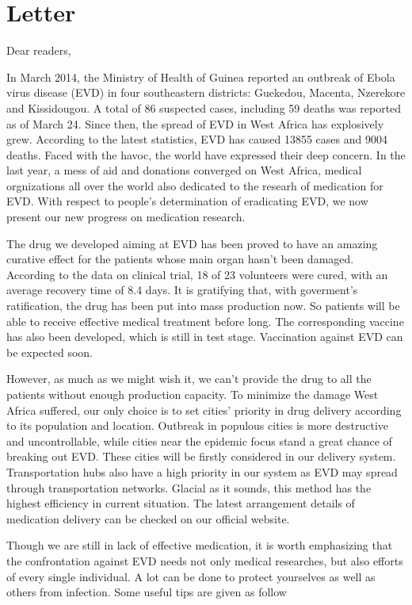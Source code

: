 \section{Letter}
Dear readers,

In March 2014, the Ministry of Health of Guinea reported an outbreak of Ebola virus disease (EVD) in four southeastern districts: Guekedou, Macenta, Nzerekore and Kissidougou. A total of 86 suspected cases, including 59 deaths was reported as of March 24. Since then, the spread of EVD in West Africa has explosively grew. According to the latest statistics, EVD has caused 13855 cases and 9004 deaths. Faced with the havoc, the world have expressed their deep concern. In the last year, a mess of aid and donations converged on West Africa, medical orgnizations all over the world also dedicated to the researh of medication for EVD. With respect to people's determination of eradicating EVD, we now present our new progress on medication research.


The drug we developed aiming at EVD has been proved to have an amazing curative effect for the patients whose main organ hasn't been damaged. According to the data on clinical trial, 18 of 23 volunteers were cured, with an average recovery time of 8.4 days. It is gratifying that, with goverment's ratification, the drug has been put into mass production now. So patients will be able to receive effective medical treatment before long. The corresponding vaccine has also been developed, which is still in test stage. Vaccination against EVD can be expected soon.


However, as much as we might wish it, we can't provide the drug to all the patients without enough production capacity. To minimize the damage West Africa suffered, our only choice is to set cities' priority in drug delivery according to its population and location. Outbreak in populous cities is more destructive and uncontrollable, while cities near the epidemic focus stand a great chance of breaking out EVD. These cities will be firstly considered in our delivery system. Transportation hubs also have a high priority in our system as EVD may spread through transportation networks. Glacial as it sounds, this method has the highest efficiency in current situation. The latest arrangement details of medication delivery can be checked on our official website.

Though we are still in lack of effective medication, it is worth emphasizing that the confrontation against EVD needs not only medical researches, but also efforts of every single individual. A lot can be done to protect yourselves as well as others from infection. Some useful tips are given as follow


